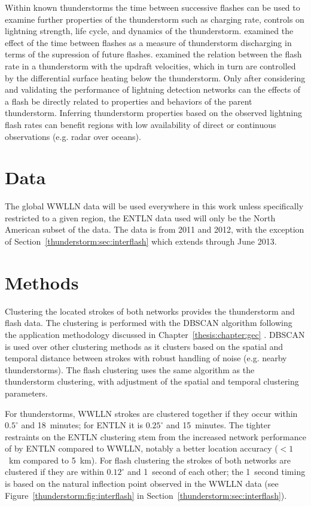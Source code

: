 Within known thunderstorms the time between successive flashes can be used to examine further properties of the thunderstorm such as charging rate, controls on lightning strength, life cycle, and dynamics of the thunderstorm.
\citet{Zoghzoghy2013} examined the effect of the time between flashes as a measure of thunderstorm discharging in terms of the supression of future flashes.
\citet{Zipser1994} examined the relation between the flash rate in a thunderstorm with the updraft velocities, which in turn are controlled by the differential surface heating below the thunderstorm.
Only after considering and validating the performance of lightning detection networks can the effects of a flash be directly related to properties and behaviors of the parent thunderstorm.
Inferring thunderstorm properties based on the observed lightning flash rates can benefit regions with low availability of direct or continuous observations (e.g. radar over oceans).

\section{Data}

The global WWLLN data will be used everywhere in this work unless specifically restricted to a given region, the ENTLN data used will only be the North American subset of the data.
The data is from 2011 and 2012, with the exception of Section~\ref{thunderstorm:sec:interflash} which extends through June 2013.

\section{Methods}

Clustering the located strokes of both networks provides the thunderstorm and flash data.
The clustering is performed with the DBSCAN algorithm \citep{Ester1996, Kriegel2011a} following the application methodology discussed in Chapter~\ref{thesis:chapter:gec} \citep{Hutchins2014}.
DBSCAN is used over other clustering methods as it clusters based on the spatial and temporal distance between strokes with robust handling of noise (e.g. nearby thunderstorms).
The flash clustering uses the same algorithm as the thunderstorm clustering, with adjustment of the spatial and temporal clustering parameters.

For thunderstorms, WWLLN strokes are clustered together if they occur within $0.5^\circ$ and 18~minutes; for ENTLN it is $0.25^\circ$ and 15~minutes.
The tighter restraints on the ENTLN clustering stem from the increased network performance of by ENTLN compared to WWLLN, notably a better location accuracy ($<1$~km compared to 5~km).
For flash clustering the strokes of both networks are clustered if they are within $0.12^\circ$ and 1~second of each other; the 1~second timing is based on the natural inflection point observed in the WWLLN data (see Figure~\ref{thunderstorm:fig:interflash} in Section~\ref{thunderstorm:sec:interflash}).

